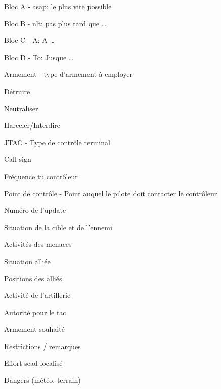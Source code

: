 \begin{e2}
\begin{e3}
	\end{e3}
	\begin{e3}
		\item Bloc A - \acrshort{asap}: le plus vite possible
		\item Bloc B - \acrshort{nlt}: pas plus tard que \ldots{}
		\item Bloc C - A: A \ldots{}
		\item Bloc D - To: Jusque \ldots{}
	\end{e3}
	\begin{e3}
		\item Armement - type d'armement à employer
		\item Détruire
		\item Neutraliser
		\item Harceler/Interdire
	\end{e3}
	\begin{e3}
		\item JTAC - Type de contrôle terminal
		\item Call-sign
		\item Fréquence tu contrôleur
		\item Point de contrôle - Point auquel le pilote doit contacter le contrôleur
	\end{e3}
	\begin{e3}
		\item Numéro de l'update
		\item Situation de la cible et de l'ennemi
		\item Activités des menaces
		\item Situation alliée
		\item Positions des alliés
		\item Activité de l'artillerie
		\item Autorité pour le \gls{tac}
		\item Armement souhaité
		\item Restrictions / remarques
		\item Effort \gls{sead} localisé
		\item Dangers (météo, terrain)
	\end{e3}


\end{e2}
